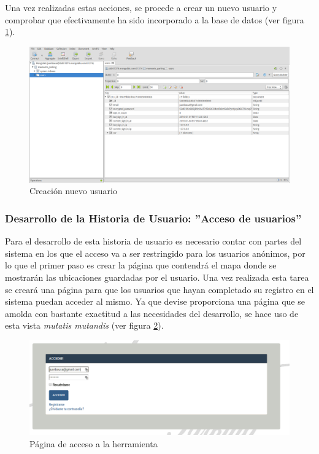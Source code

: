 	Una vez realizadas estas acciones, se procede a crear un nuevo usuario y comprobar que efectivamente ha sido incorporado a la base de datos (ver figura \ref{fig:acceso_usuarios_07}).
	
	\begin{figure}[H]
		\centering
		\includegraphics[width=15cm, fbox={\fboxrule} 4mm]{images/05-resultados/10-acceso_usuarios_7.png}
		\caption{Creación nuevo usuario}
		\label{fig:acceso_usuarios_07}
	\end{figure}
	
	\subsubsection{Desarrollo de la Historia de Usuario: ''Acceso de usuarios'' }
	Para el desarrollo de esta historia de usuario es necesario contar con partes del sistema en los que el acceso va a ser restringido para los usuarios anónimos, por lo que el primer paso es crear la página que contendrá el mapa donde se mostrarán las ubicaciones guardadas por el usuario.
	Una vez realizada esta tarea se creará una página para que los usuarios que hayan completado su registro en el sistema puedan acceder al mismo. Ya que devise proporciona una página que se amolda con bastante exactitud a las necesidades del desarrollo, se hace uso de esta vista \textit{mutatis mutandis} (ver figura \ref{fig:acceso_usuarios_08}).
	
	\begin{figure}[H]
		\centering
		\includegraphics[width=15cm, fbox={\fboxrule} 4mm]{images/05-resultados/11-acceso_usuarios_8.png}
		\caption{Página de acceso a la herramienta}
		\label{fig:acceso_usuarios_08}
	\end{figure}	
	
